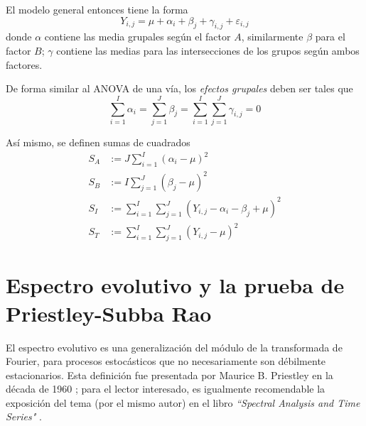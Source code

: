 \documentclass[12pt,letterpaper]{book}
\begin{document}
El modelo general entonces tiene la forma
\begin{equation}
Y_{i,j} = \mu + \alpha_i + \beta_j + \gamma_{i,j}  + \varepsilon_{i,j}
\end{equation}
donde $\alpha$ contiene las media grupales según el factor $A$, similarmente $\beta$ para el factor $B$; $\gamma$ contiene las medias para las intersecciones de los grupos según ambos factores.

De forma similar al ANOVA de una vía, los \textit{efectos grupales} deben ser tales que 
\begin{equation}
\sum_{i=1}^I \alpha_i = \sum_{j=1}^J \beta_j = \sum_{i=1}^I \sum_{j=1}^J \gamma_{i,j} = 0
\end{equation}

Así mismo, se definen sumas de cuadrados
\begin{align}
S_A &:= J \sum_{i=1}^I \left( \alpha_i - \mu \right)^2 \\
S_B &:= I \sum_{j=1}^J \left( \beta_j  - \mu \right)^2 \\
S_I &:= \sum_{i=1}^I \sum_{j=1}^J \left( Y_{i,j} - \alpha_i - \beta_j + \mu \right)^2 \\
S_T &:= \sum_{i=1}^I \sum_{j=1}^J \left( Y_{i,j}  - \mu \right)^2 
\end{align}


\chapter{Espectro evolutivo y la prueba de Priestley-Subba Rao}
\label{capitulo:espectro_evo}

%

El espectro evolutivo es una generalización del módulo de la transformada de Fourier, para procesos estocásticos que no necesariamente son débilmente estacionarios.
%
Esta definición fue presentada por Maurice B. Priestley en la década de 1960 \cite{Priestley65,Priestley66,Priestley69};
%
para el lector interesado, es igualmente recomendable la exposición del tema (por el mismo autor) en el libro \textit{``Spectral Analysis and Time Series"} \cite{Priestley81}.
\end{document}
